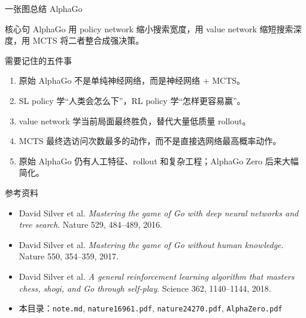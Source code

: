 \documentclass[UTF8,aspectratio=169,10pt]{ctexbeamer}
\begin{document}
\begin{frame}{一张图总结 AlphaGo}
  \begin{center}
  \end{center}

  \vspace{0.4cm}
  \begin{block}{核心句}
    AlphaGo 用 policy network 缩小搜索宽度，用 value network 缩短搜索深度，用 MCTS 将二者整合成强决策。
  \end{block}
\end{frame}

\begin{frame}{需要记住的五件事}
  \begin{enumerate}
    \item 原始 AlphaGo 不是单纯神经网络，而是神经网络 + MCTS。
    \item SL policy 学“人类会怎么下”，RL policy 学“怎样更容易赢”。
    \item value network 学当前局面最终胜负，替代大量低质量 rollout。
    \item MCTS 最终选访问次数最多的动作，而不是直接选网络最高概率动作。
    \item 原始 AlphaGo 仍有人工特征、rollout 和复杂工程；AlphaGo Zero 后来大幅简化。
  \end{enumerate}
\end{frame}

\begin{frame}{参考资料}
  \begin{itemize}
    \item David Silver et al. \textit{Mastering the game of Go with deep neural networks and tree search}. Nature 529, 484--489, 2016.
    \item David Silver et al. \textit{Mastering the game of Go without human knowledge}. Nature 550, 354--359, 2017.
    \item David Silver et al. \textit{A general reinforcement learning algorithm that masters chess, shogi, and Go through self-play}. Science 362, 1140--1144, 2018.
    \item 本目录：\texttt{note.md}, \texttt{nature16961.pdf}, \texttt{nature24270.pdf}, \texttt{AlphaZero.pdf}
  \end{itemize}
\end{frame}
\end{document}
